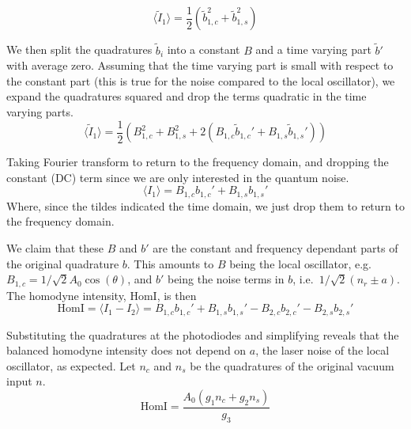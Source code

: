 \documentclass[aps,pra,superscriptaddress,reprint,nofootinbib]{revtex4-1}
\newcommand{\expect}[1]{\langle #1 \rangle}
\begin{document}
\begin{equation}
\expect{\tilde{I}_1} = \frac{1}{2} \left( \tilde{b}_{1,c}^2 + \tilde{b}_{1,s}^2 \right)
\end{equation}


We then split the quadratures $\tilde{b}_i$ into a constant $B$ and a time varying part $\tilde{b}'$ with average zero. Assuming that the time varying part is small with respect to the constant part (this is true for the noise compared to the local oscillator), we expand the quadratures squared and drop the terms quadratic in the time varying parts.
\begin{equation}
\expect{\tilde{I}_1} = \frac{1}{2} \left( B_{1,c}^2 + B_{1,s}^2 + 2 \left( B_{1,c} \tilde{b}_{1,c}' + B_{1,s} \tilde{b}_{1,s}' \right) \right)
\end{equation}


Taking Fourier transform to return to the frequency domain, and dropping the constant (DC) term since we are only interested in the quantum noise.
\begin{equation}
\expect{I_1} = B_{1,c} b_{1,c}' + B_{1,s} b_{1,s}'
\end{equation}
Where, since the tildes indicated the time domain, we just drop them to return to the frequency domain.

We claim that these $B$ and $b'$ are the constant and frequency dependant parts of the original quadrature $b$. This amounts to $B$ being the local oscillator, e.g.\ $B_{1,c} = 1/\sqrt{2} A_0 \cos(\theta)$, and $b'$ being the noise terms in $b$, i.e.\ $1/\sqrt{2} (n_r \pm a)$. The homodyne intensity, $\mathrm{HomI}$, is then
\begin{equation}
\mathrm{HomI} = \expect{I_1 - I_2} = B_{1,c} b_{1,c}' + B_{1,s} b_{1,s}' - B_{2,c} b_{2,c}' - B_{2,s} b_{2,s}'
\end{equation}


Substituting the quadratures at the photodiodes and simplifying reveals that the balanced homodyne intensity does not depend on $a$, the laser noise of the local oscillator, as expected. Let $n_c$ and $n_s$ be the quadratures of the original vacuum input $n$.
\begin{equation}
\mathrm{HomI} = \frac{A_0(g_1 n_c + g_2 n_s)}{g_3}
\end{equation}
\end{document}
